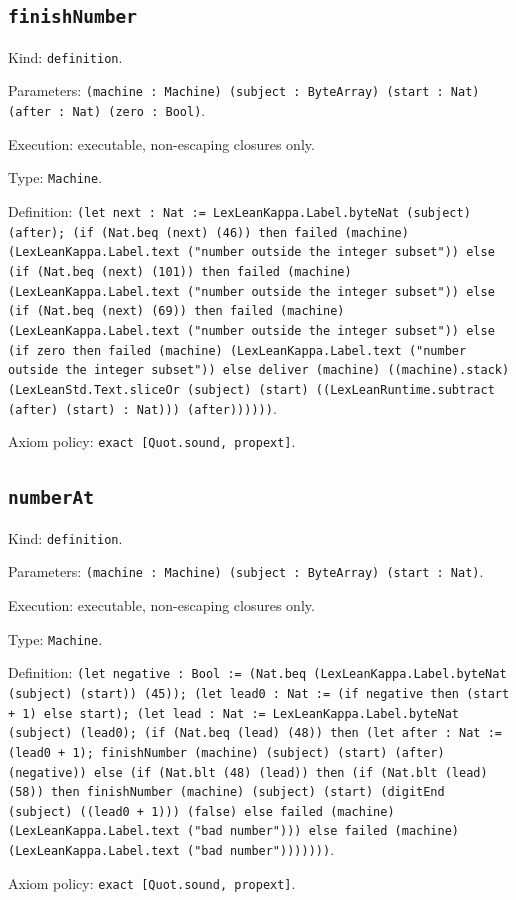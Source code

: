 \documentclass[11pt]{article}
\begin{document}
\subsection*{\texttt{finishNumber}}
\noindent Kind: \texttt{definition}.\par
\noindent Parameters: \texttt{(machine : Machine) (subject : ByteArray) (start : Nat) (after : Nat) (zero : Bool)}.\par
\noindent Execution: executable, non-escaping closures only.\par
\noindent Type: \texttt{Machine}.\par
\noindent Definition: \texttt{(let next : Nat := LexLeanKappa.Label.byteNat (subject) (after); (if (Nat.beq (next) (46)) then failed (machine) (LexLeanKappa.Label.text ("number outside the integer subset")) else (if (Nat.beq (next) (101)) then failed (machine) (LexLeanKappa.Label.text ("number outside the integer subset")) else (if (Nat.beq (next) (69)) then failed (machine) (LexLeanKappa.Label.text ("number outside the integer subset")) else (if zero then failed (machine) (LexLeanKappa.Label.text ("number outside the integer subset")) else deliver (machine) ((machine).stack) (LexLeanStd.Text.sliceOr (subject) (start) ((LexLeanRuntime.subtract (after) (start) : Nat))) (after))))))}.\par
\noindent Axiom policy: \texttt{exact [Quot.sound, propext]}.\par
\subsection*{\texttt{numberAt}}
\noindent Kind: \texttt{definition}.\par
\noindent Parameters: \texttt{(machine : Machine) (subject : ByteArray) (start : Nat)}.\par
\noindent Execution: executable, non-escaping closures only.\par
\noindent Type: \texttt{Machine}.\par
\noindent Definition: \texttt{(let negative : Bool := (Nat.beq (LexLeanKappa.Label.byteNat (subject) (start)) (45)); (let lead0 : Nat := (if negative then (start + 1) else start); (let lead : Nat := LexLeanKappa.Label.byteNat (subject) (lead0); (if (Nat.beq (lead) (48)) then (let after : Nat := (lead0 + 1); finishNumber (machine) (subject) (start) (after) (negative)) else (if (Nat.blt (48) (lead)) then (if (Nat.blt (lead) (58)) then finishNumber (machine) (subject) (start) (digitEnd (subject) ((lead0 + 1))) (false) else failed (machine) (LexLeanKappa.Label.text ("bad number"))) else failed (machine) (LexLeanKappa.Label.text ("bad number")))))))}.\par
\noindent Axiom policy: \texttt{exact [Quot.sound, propext]}.\par
\end{document}
